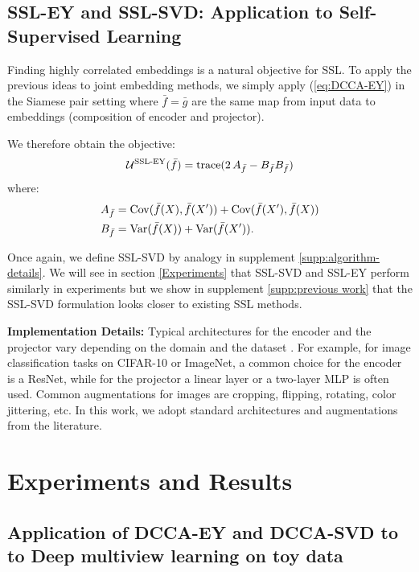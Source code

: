 \subsection{SSL-EY and SSL-SVD: Application to Self-Supervised Learning}

Finding highly correlated embeddings is a natural objective for SSL.
To apply the previous ideas to joint embedding methods, we simply apply (\ref{eq:DCCA-EY}) in the Siamese pair setting where $\bar{f}=\bar{g}$ are the same map from input data to embeddings (composition of encoder and projector).

We therefore obtain the objective:
\begin{align}\label{eq:SSL-EY}
    \mathcal{U}^\text{SSL-EY}(\bar{f}) =\operatorname{trace}( 2 \, A_{\bar{f}} - B_{\bar{f}} B_{\bar{f}})
\end{align}
where:
\begin{align*}
    A_{\bar{f}}
    &= \mathrm{Cov}(\bar{f}(X),\bar{f}(X')) + \mathrm{Cov}(\bar{f}(X'),\bar{f}(X)) \\
    B_{\bar{f}} 
    &= \mathrm{Var}(\bar{f}(X)) + \mathrm{Var}(\bar{f}(X')).
\end{align*}

Once again, we define SSL-SVD by analogy in supplement \ref{supp:algorithm-details}. We will see in section \ref{Experiments} that SSL-SVD and SSL-EY perform similarly in experiments but we show in supplement \ref{supp:previous work} that the SSL-SVD formulation looks closer to existing SSL methods.

\textbf{Implementation Details:} Typical architectures for the encoder and the projector vary depending on the domain and the dataset \cite{balestriero2023cookbook}. For example, for image classification tasks on CIFAR-10 or ImageNet, a common choice for the encoder is a ResNet, while for the projector a linear layer or a two-layer MLP is often used. Common augmentations for images are cropping, flipping, rotating, color jittering, etc. In this work, we adopt standard architectures and augmentations from the literature.


\section{Experiments and Results}

\subsection{Application of DCCA-EY and DCCA-SVD to to Deep multiview learning on toy data}

